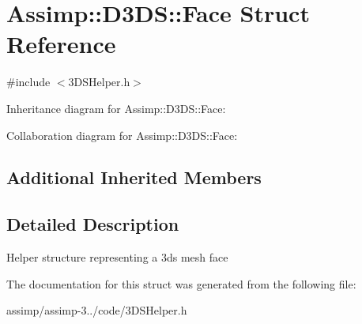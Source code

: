 \hypertarget{struct_assimp_1_1_d3_d_s_1_1_face}{\section{Assimp\+:\+:D3\+D\+S\+:\+:Face Struct Reference}
\label{struct_assimp_1_1_d3_d_s_1_1_face}
}


{\ttfamily \#include $<$3\+D\+S\+Helper.\+h$>$}



Inheritance diagram for Assimp\+:\+:D3\+D\+S\+:\+:Face\+:


Collaboration diagram for Assimp\+:\+:D3\+D\+S\+:\+:Face\+:
\subsection*{Additional Inherited Members}


\subsection{Detailed Description}
Helper structure representing a 3ds mesh face 

The documentation for this struct was generated from the following file\+:\begin{DoxyCompactItemize}
\item 
assimp/assimp-\/3../code/3\+D\+S\+Helper.\+h\end{DoxyCompactItemize}
